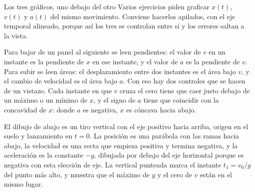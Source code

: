 \documentclass[11pt,openany]{book}
\begin{document}
\begin{bloque}{Los tres gráficos, uno debajo del otro}
Varios ejercicios piden graficar $x(t)$, $v(t)$ y $a(t)$ del mismo movimiento. Conviene hacerlos apilados, con el eje temporal alineado, porque así los tres se controlan entre sí y los errores saltan a la vista.

Para bajar de un panel al siguiente se leen pendientes: el valor de $v$ en un instante es la pendiente de $x$ en ese instante, y el valor de $a$ es la pendiente de $v$. Para subir se leen áreas: el desplazamiento entre dos instantes es el área bajo $v$, y el cambio de velocidad es el área bajo $a$. Con eso hay dos controles que se hacen de un vistazo. Cada instante en que $v$ cruza el cero tiene que caer justo debajo de un máximo o un mínimo de $x$, y el signo de $a$ tiene que coincidir con la concavidad de $x$: donde $a$ es negativa, $x$ es cóncava hacia abajo.

El dibujo de abajo es un tiro vertical con el eje positivo hacia arriba, origen en el suelo y lanzamiento en $t=0$. La posición es una parábola con las ramas hacia abajo, la velocidad es una recta que empieza positiva y termina negativa, y la aceleración es la constante $-g$, dibujada por debajo del eje horizontal porque es negativa con esta elección de eje. La vertical punteada marca el instante $t_1=v_0/g$ del punto más alto, y muestra que el máximo de $y$ y el cero de $v$ están en el mismo lugar.

\begin{center}
\end{center}
\end{bloque}
\end{document}
